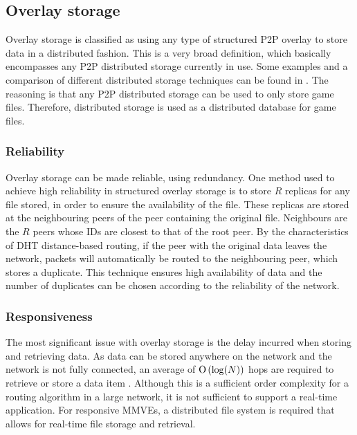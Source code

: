 \subsection{Overlay storage}
\label{overlay_storage}

Overlay storage is classified as using any type of structured P2P overlay to store data in a distributed fashion. This is a very broad definition, which basically encompasses any P2P distributed storage currently in use. Some examples and a comparison of different distributed storage techniques can be found in \cite{Hasan_distributed_storage_survey}. The reasoning is that any P2P distributed storage can be used to only store game files. Therefore, distributed storage is used as a distributed database for game files.

\subsubsection{Reliability}
\label{overlay_storage_reliability}

Overlay storage can be made reliable, using redundancy. One method used to achieve high reliability in structured overlay storage is to store $R$ replicas for any file stored, in order to ensure the availability of the file. These replicas are stored at the neighbouring peers of the peer containing the original file. Neighbours are the $R$ peers whose IDs are closest to that of the root peer. By the characteristics of DHT distance-based routing, if the peer with the original data leaves the network, packets will automatically be routed to the neighbouring peer, which stores a duplicate. This technique ensures high availability of data and the number of duplicates can be chosen according to the reliability of the
network.


\subsubsection{Responsiveness}

The most significant issue with overlay storage is the delay incurred when storing and retrieving data. As data can be stored anywhere on the network and the network is not fully connected, an average of $\operatorname{O}\left(\log(N)\right)$ hops are required to retrieve or store a data item \cite{storage_and_chaching_PAST}. Although this is a sufficient order complexity for a routing algorithm in a large network, it is not sufficient to support a real-time application. For responsive MMVEs, a distributed file system is required that allows for real-time file storage and retrieval.

